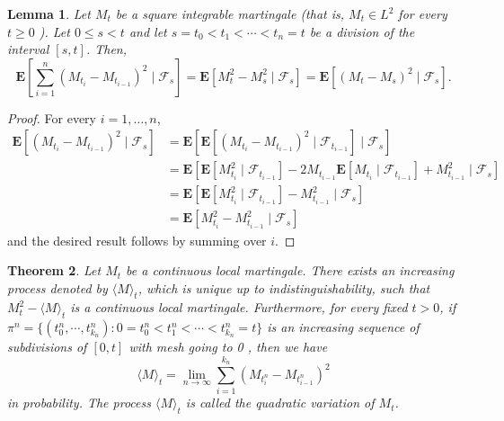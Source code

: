 \documentclass[twoside, 12pt]{book}
\numberwithin{equation}{chapter}
\newtheorem{theorem}{Theorem}[section]
\newtheorem{lemma}[theorem]{Lemma}
\def\bE{{\mathbf E}}
\def\geq{\geqslant}
\def\leq{\leqslant}
\begin{document}
	\begin{lemma}
		Let $M_t$ be a square integrable martingale (that is, $M_t \in L^2$ for every $t \geq 0$ ). Let $0 \leq s<t$ and let $s=t_0<t_1<\cdots<t_n=t$ be a division of the interval $[s, t]$. Then,
		$$
		\bE\left[\sum_{i=1}^n\left(M_{t_i}-M_{t_{i-1}}\right)^2 \mid \mathcal{F}_s\right]=\bE\left[M_t^2-M_s^2 \mid \mathcal{F}_s\right]=\bE\left[\left(M_t-M_s\right)^2 \mid \mathcal{F}_s\right] .
		$$
	\end{lemma}
	\begin{proof}
		For every $i=1, \ldots, n$,
		$$
		\begin{aligned}
			\bE \left[ \left(M_{t_i}-M_{t_{i-1}}\right)^2 \mid \mathcal{F}_s\right] & =\bE\left[\bE \left[\left(M_{t_i}-M_{t_{i-1}}\right)^2 \mid \mathcal{F}_{t_{i-1}}\right] \mid \mathcal{F}_s\right] \\
			& =\bE\left[\bE\left[M_{t_i}^2 \mid \mathcal{F}_{t_{i-1}}\right]-2 M_{t_{i-1}} \bE\left[M_{t_i} \mid \mathcal{F}_{t_{i-1}}\right]+M_{t_{i-1}}^2 \mid \mathcal{F}_s\right] \\
			& =\bE\left[\bE\left[M_{t_i}^2 \mid \mathcal{F}_{t_{i-1}}\right]-M_{t_{i-1}}^2 \mid \mathcal{F}_s\right] \\
			& =\bE\left[M_{t_i}^2-M_{t_{i-1}}^2 \mid \mathcal{F}_s\right]
		\end{aligned}
		$$
		and the desired result follows by summing over $i$. 
	\end{proof}
	
	
	\begin{theorem}\label{Thm:quadratic}
		Let $M_t$ be a continuous local martingale. There exists an increasing process denoted by $\langle M \rangle_t$, which is unique up to indistinguishability, such that $M_t^2-\langle M\rangle_t$ is a continuous local martingale. Furthermore, for every fixed $t>0$, if $\pi^n=\{(t_0^n,\cdots, t_{k_n}^n): 0=t_0^n<t_1^n<\cdots<t_{k_n}^n=t\}$ is an increasing sequence of subdivisions of $[0, t]$ with mesh going to 0 , then we have
		\begin{equation}\label{eq:quadratic}
			\langle  M\rangle_t=\lim _{n \rightarrow \infty} \sum_{i=1}^{k_n}\left(M_{t_i^n}-M_{t_{i-1}^n}\right)^2
		\end{equation}
		in probability. The process $\langle M\rangle_t$ is called the quadratic variation of $M_t $. 
	\end{theorem}
	
\end{document}
